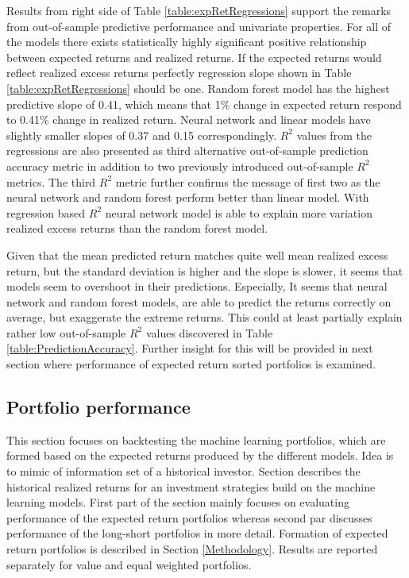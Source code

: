 \documentclass{article}
\begin{document}
Results from right side of Table \ref{table:expRetRegressions} support the remarks from out-of-sample predictive performance and univariate properties. For all of the models there exists statistically highly significant positive relationship between expected returns and realized returns. If the expected returns would reflect realized excess returns perfectly regression slope shown in Table \ref{table:expRetRegressions} should be one. Random forest model has the highest predictive slope of 0.41, which means that 1\% change in expected return respond to 0.41\% change in realized return. Neural network and linear models have slightly smaller slopes of 0.37 and 0.15 correspondingly. $R^2$ values from the regressions are also presented as third alternative out-of-sample prediction accuracy metric in addition to two previously introduced out-of-sample $R^2$ metrics. The third $R^2$ metric further confirms the message of first two as the neural network and random forest perform better than linear model. With regression based $R^2$ neural network model is able to explain more variation realized excess returns than the random forest model. \par

Given that the mean predicted return matches quite well mean realized excess return, but the standard deviation is higher and the slope is slower, it seems that models seem to overshoot in their predictions. Especially,  It seems that neural network and random forest models, are able to predict the returns correctly on average, but exaggerate the extreme returns. This could at least partially explain rather low out-of-sample $R^2$ values discovered in Table \ref{table:PredictionAccuracy}. Further insight for this will be provided in next section where performance of expected return sorted portfolios is examined. \par

\subsection{Portfolio performance}\label{Portfolio performance}

This section focuses on backtesting the machine learning portfolios, which are formed based on the expected returns produced by the different models. Idea is to mimic of information set of a historical investor. Section describes the historical realized returns for an investment strategies build on the machine learning models. First part of the section mainly focuses on evaluating performance of the expected return portfolios whereas second par discusses performance of the long-short portfolios in more detail. Formation of expected return portfolios is described in Section \ref{Methodology}. Results are reported separately for value and equal weighted portfolios. \par
\end{document}
